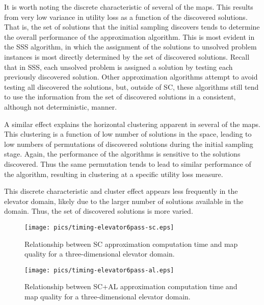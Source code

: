 It is worth noting the discrete characteristic of several of the maps.  This results from very low variance in utility loss as a function of the discovered solutions.  That is, the set of solutions that the initial sampling discovers tends to determine the overall performance of the approximation algorithm.  This is most evident in the SSS algorithm, in which the assignment of the solutions to unsolved problem instances is most directly determined by the set of discovered solutions.  Recall that in SSS, each unsolved problem is assigned a solution by testing each previously discovered solution.  Other approximation algorithms attempt to avoid testing all discovered  the solutions, but, outside of SC, these algorithms still tend to use the information from the set of discovered solutions in a consistent, although not deterministic, manner.

A similar effect explains the horizontal clustering apparent in several of the maps.  This clustering is a function of low number of solutions in the space, leading to low numbers of permutations of discovered solutions during the initial sampling stage.  Again, the performance of the algorithms is sensitive to the solutions discovered.  Thus the same permutation tends to lead to similar performance of the algorithm, resulting in clustering at a specific utility loss measure.


This discrete characteristic and cluster effect appears less frequently in the elevator domain, likely due to the larger number of solutions available in the domain.  Thus, the set of discovered solutions  is more varied.




\begin{figure}
\begin{center}
\texttt{[image: pics/timing-elevator6pass-sc.eps]}
\caption{Relationship between SC approximation computation time and map quality for a three-dimensional elevator domain.}
\label{fig:timing-elevator6pass-sc}
\end{center}
\end{figure}

\begin{figure}
\begin{center}
\texttt{[image: pics/timing-elevator6pass-al.eps]}
\caption{Relationship between SC+AL approximation computation time and map quality for a three-dimensional elevator domain.}
\label{fig:timing-elevator6pass-al}
\end{center}
\end{figure}

